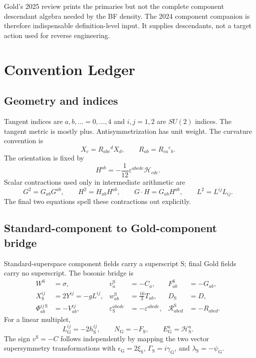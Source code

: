 \documentclass[11pt]{article}
\newcommand{\cR}{\mathcal R}
\newcommand{\eps}{\varepsilon}
\newcommand{\std}{\mathrm S}
\newcommand{\Gold}{\mathrm G}
\begin{document}
Gold's 2025 review prints the primaries but not the complete component
descendant algebra needed by the BF density.  The 2024 component companion is
therefore indispensable definition-level input.  It supplies descendants,
not a target action used for reverse engineering.

\section{Convention Ledger}

\subsection{Geometry and indices}

Tangent indices are $a,b,\ldots=0,\ldots,4$ and $i,j=1,2$ are $SU(2)$
indices.  The tangent metric is mostly plus.  Antisymmetrization has unit
weight.  The curvature convention is
\begin{equation}
[\nabla_a,\nabla_b]X_c=R_{ab c}{}^{d}X_d,
\qquad R_{ab}=R_{ca}{}^{c}{}_{b}.
\label{eq:Rconv}
\end{equation}
The orientation is fixed by
\begin{equation}
H^{ab}=-\frac1{12}\eps^{abcde}\mathcal H_{cde}.
\label{eq:Hdual}
\end{equation}
Scalar contractions used only in intermediate arithmetic are
\[
G^2=G_{ab}G^{ab},\qquad H^2=H_{ab}H^{ab},\qquad
G\!\cdot H=G_{ab}H^{ab},\qquad L^2=L^{ij}L_{ij}.
\]
The final two equations spell these contractions out explicitly.

\subsection{Standard-component to Gold-component bridge}

Standard-superspace component fields carry a superscript $\std$; final Gold
fields carry no superscript.  The bosonic bridge is
\begin{equation}
\begin{aligned}
W^{\std}&=\sigma,&v_a^{\std}&=-C_a,&F_{ab}^{\std}&=-G_{ab},\\
X_{\std}^{ij}&=2Y^{ij}=-gL^{ij},&
w_{ab}^{\std}&=\frac{16}{3}T_{ab},&D_{\std}&=D,\\
\Phi_{ab}^{ij\,\std}&=-V_{ab}^{ij},&
\eps_{\std}^{abcde}&=-\eps^{abcde},&
\cR_{abcd}^{\std}&=-R_{abcd}.
\end{aligned}
\label{eq:bridge}
\end{equation}
For a linear multiplet,
\begin{equation}
L_{\Gold}^{ij}=-2h_{\std}^{ij},\qquad
N_{\Gold}=-F_{\std},\qquad
E_{\Gold}^a=\mathcal H_{\std}^a.
\label{eq:linearbridge}
\end{equation}
The sign $v^{\std}=-C$ follows independently by mapping the two vector
supersymmetry transformations with
$\epsilon_{\Gold}=2\xi_{\std}$,
$\Gamma_{\std}=i\gamma_{\Gold}$, and
$\lambda_{\std}=-\psi_{\Gold}$.
\end{document}
